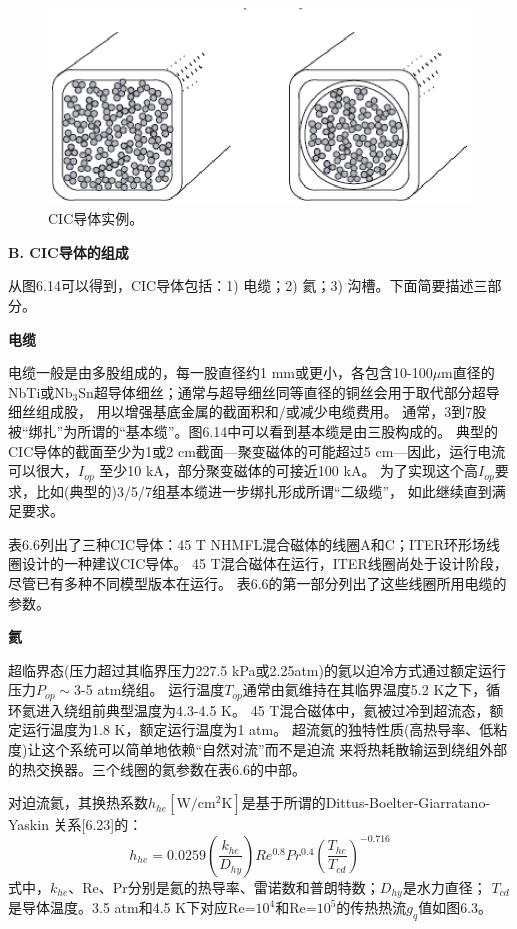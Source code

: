 \begin{figure}[htbp]
	\centering
	\includegraphics[scale=0.7]{chpt6/figs/fig6.14.eps}
	\caption{CIC导体实例。}
\end{figure}

\textbf{B. CIC导体的组成}

从图6.14可以得到，CIC导体包括：1) 电缆；2) 氦；3) 沟槽。下面简要描述三部分。

\textbf{电缆}

电缆一般是由多股组成的，每一股直径约1 mm或更小，各包含10-100$\mu$m直径的
NbTi或$\mathrm{Nb_3Sn}$超导体细丝；通常与超导细丝同等直径的铜丝会用于取代部分超导细丝组成股，
用以增强基底金属的截面积和/或减少电缆费用。
通常，3到7股被“绑扎”为所谓的“基本缆”。图6.14中可以看到基本缆是由三股构成的。
典型的CIC导体的截面至少为1或2 cm截面---聚变磁体的可能超过5 cm---因此，运行电流可以很大，$I_{op}$
至少10 kA，部分聚变磁体的可接近100 kA。
为了实现这个高$I_{op}$要求，比如(典型的)3/5/7组基本缆进一步绑扎形成所谓“二级缆”，
如此继续直到满足要求。

表6.6列出了三种CIC导体：45 T NHMFL混合磁体的线圈A和C；ITER环形场线圈设计的一种建议CIC导体。
45 T混合磁体在运行，ITER线圈尚处于设计阶段，尽管已有多种不同模型版本在运行。
表6.6的第一部分列出了这些线圈所用电缆的参数。

\textbf{氦}

超临界态(压力超过其临界压力227.5 kPa或2.25atm)的氦以迫冷方式通过额定运行压力$P_{op}\sim$3-5 atm绕组。
运行温度$T_{op}$通常由氦维持在其临界温度5.2 K之下，循环氦进入绕组前典型温度为4.3-4.5 K。
45 T混合磁体中，氦被过冷到超流态，额定运行温度为1.8 K，额定运行温度为1 atm。
超流氦的独特性质(高热导率、低粘度)让这个系统可以简单地依赖“自然对流”而不是迫流
来将热耗散输运到绕组外部的热交换器。三个线圈的氦参数在表6.6的中部。

对迫流氦，其换热系数$h_{he}[\mathrm{W/cm^2 K}]$是基于所谓的Dittus-Boelter-Giarratano-Yaskin
关系[6.23]的：
\begin{equation}%
h_{he}=0.0259(\frac{k_{he}}{D_{hy}})Re^{0.8}Pr^{0.4}(\frac{T_{he}}{T_{cd}})^{-0.716}
\end{equation}
式中，$k_{he}$、Re、Pr分别是氦的热导率、雷诺数和普朗特数；$D_{hy}$是水力直径；
$T_{cd}$是导体温度。3.5 atm和4.5 K下对应Re=$10^4$和Re=$10^5$的传热热流$g_q$值如图6.3。

